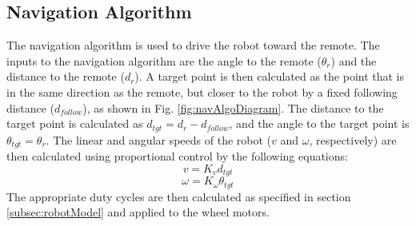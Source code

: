 \subsection{Navigation Algorithm}\label{subsec:navAlgo}
The navigation algorithm is used to drive the robot toward the remote. The inputs to the navigation algorithm are the angle to the remote ($\theta_r$) and the distance to the remote ($d_r$). A target point is then calculated as the point that is in the same direction as the remote, but closer to the robot by a fixed following distance ($d_{follow}$), as shown in Fig. \ref{fig:navAlgoDiagram}. The distance to the target point is calculated as $d_{tgt} = d_r - d_{follow}$, and the angle to the target point is $\theta_{tgt} = \theta_r$. The linear and angular speeds of the robot ($v$ and $\omega$, respectively) are then calculated using proportional control by the following equations:
$$v = K_vd_{tgt}$$
$$\omega = K_\omega\theta_{tgt}$$
The appropriate duty cycles are then calculated as specified in section \ref{subsec:robotModel} and applied to the wheel motors.
